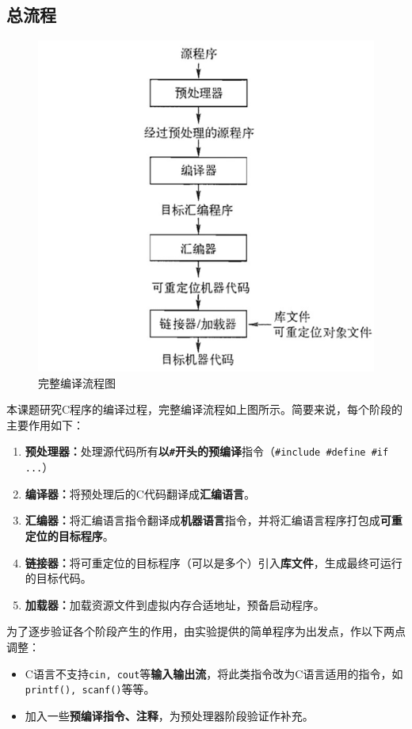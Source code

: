 \documentclass[UTF8,a4paper,10pt]{ctexart}
\begin{document}
\subsection{总流程}
\begin{figure} [H]
    \centering
    \includegraphics[width=0.7\linewidth]{the_whole_process_screenshot.png}
    \caption{完整编译流程图}
    \label{fig:placeholder}
\end{figure}
本课题研究C程序的编译过程，完整编译流程如上图所示。简要来说，每个阶段的主要作用如下：
\begin{enumerate}
    \item \textbf{预处理器：}处理源代码所有\textbf{以\texttt{\#}开头的预编译}指令（\texttt{\#include \#define \#if ...}）
    \item \textbf{编译器：}将预处理后的C代码翻译成\textbf{汇编语言}。
    \item \textbf{汇编器：}将汇编语言指令翻译成\textbf{机器语言}指令，并将汇编语言程序打包成\textbf{可重定位的目标程序}。
    \item \textbf{链接器：}将可重定位的目标程序（可以是多个）引入\textbf{库文件}，生成最终可运行的目标代码。
    \item \textbf{加载器：}加载资源文件到虚拟内存合适地址，预备启动程序。
\end{enumerate}

为了逐步验证各个阶段产生的作用，由实验提供的简单程序为出发点，作以下两点调整：
\begin{itemize}
    \item C语言不支持\texttt{cin, cout}等\textbf{输入输出流}，将此类指令改为C语言适用的指令，如\texttt{printf(), scanf()}等等。
    \item 加入一些\textbf{预编译指令、注释}，为预处理器阶段验证作补充。
\end{itemize}
\end{document}
